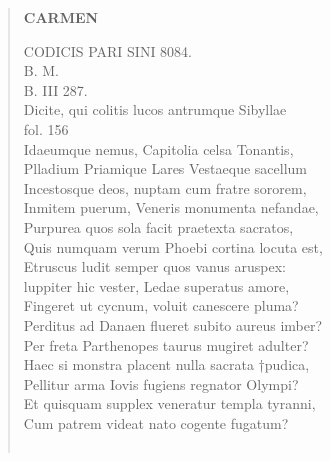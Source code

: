 \documentclass[11pt, a4paper]{report}
\begin{document}
\begin{verse}
    \begin{center} \textbf{CARMEN} \end{center}CODICIS PARI SINI 8084. \\ B. M. \\ B. III 287. \\ Dicite, qui colitis lucos antrumque Sibyllae \\ fol. 156 \\ Idaeumque nemus, Capitolia celsa Tonantis, \\ Plladium Priamique Lares Vestaeque sacellum \\ Incestosque deos, nuptam cum fratre sororem, \\ Inmitem puerum, Veneris monumenta nefandae, \\ Purpurea quos sola facit praetexta sacratos, \\ Quis numquam verum Phoebi cortina locuta est, \\ Etruscus ludit semper quos vanus aruspex: \\ luppiter hic vester, Ledae superatus amore, \\ Fingeret ut cycnum, voluit canescere pluma? \\ Perditus ad Danaen flueret subito aureus imber? \\ Per freta Parthenopes
                    taurus mugiret adulter? \\ Haec si monstra placent nulla sacrata †pudica, \\ Pellitur arma Iovis fugiens regnator Olympi? \\ Et quisquam supplex veneratur templa tyranni, \\ Cum patrem videat nato cogente fugatum? \\ 
        ﻿\pagebreak 

\end{verse}
\end{document}
